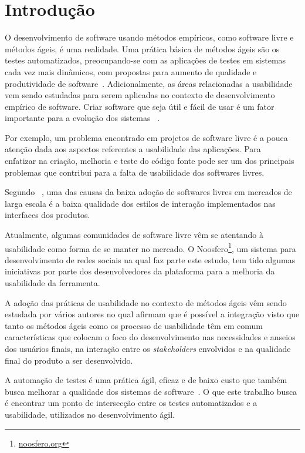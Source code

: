 \chapter{Introdução}

O desenvolvimento de software usando métodos empíricos, como software livre e métodos ágeis, é uma realidade. Uma prática básica de métodos ágeis são os testes automatizados, preocupando-se com as aplicações de testes em sistemas cada vez mais dinâmicos, com propostas para aumento de qualidade e produtividade de software~\cite{vicente2010}.
%
Adicionalmente, as áreas relacionadas a usabilidade vem sendo estudadas para serem aplicadas no contexto de desenvolvimento empírico de software. Criar software que seja útil e fácil de usar é um fator importante para a evolução dos sistemas ~\cite{santos2012}.

Por exemplo, um problema encontrado em projetos de software livre é a pouca atenção dada aos aspectos referentes a usabilidade das aplicações. Para ~ enfatizar na criação, melhoria e teste do código fonte pode ser um dos principais problemas que contribui para a falta de usabilidade dos softwares livres.

%
Segundo ~, uma das causas da baixa adoção de softwares livres em mercados de larga escala é a baixa qualidade dos estilos de interação implementados nas interfaces dos produtos. 

Atualmente, algumas comunidades de software livre vêm se atentando à usabilidade como forma de se manter no mercado. 
%
O Noosfero\footnote{\url{noosfero.org}}, um sistema para desenvolvimento de redes sociais na qual faz parte este estudo, tem tido algumas iniciativas por parte dos desenvolvedores da plataforma para a melhoria da usabilidade da ferramenta. 

A adoção das práticas de usabilidade no contexto de métodos ágeis vêm sendo estudada por vários autores no qual afirmam que é possível a integração visto que tanto os métodos ágeis como os processo de usabilidade têm em comum características que colocam o foco do desenvolvimento nas necessidades e anseios dos usuários finais, na interação entre os \textit{stakeholders} envolvidos e na qualidade final do produto a ser desenvolvido.

A automação de testes é uma prática ágil, eficaz e de baixo custo que também busca melhorar a qualidade dos sistemas de software~\cite{cotter1995}. O que este trabalho busca é encontrar um ponto de intersecção entre os testes automatizados e a usabilidade, utilizados no desenvolvimento ágil.

